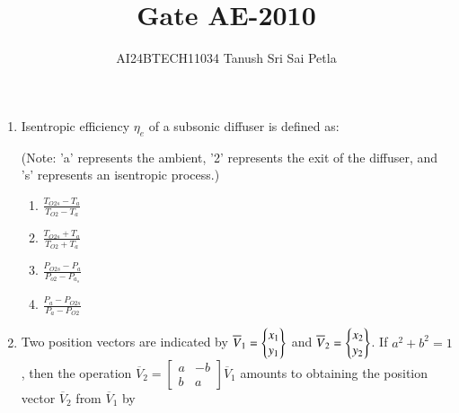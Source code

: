 \documentclass[journal]{IEEEtran}
\begin{document}

\vspace{3cm}


\renewcommand{\thefigure}{\theenumi}
\renewcommand{\thetable}{\theenumi}
\setlength{\intextsep}{10pt} %


\renewcommand{\thetable}{\theenumi}

\title{Gate AE-2010}
\author{AI24BTECH11034 Tanush Sri Sai Petla
}
\maketitle
\renewcommand{\thefigure}{\theenumi}
\renewcommand{\thetable}{\theenumi}
\begin{enumerate}[start=1]

\item  Isentropic efficiency $\eta_e$ of a subsonic diffuser is defined as:

(Note: 'a' represents the ambient, '2' represents the exit of the diffuser, and 's' represents an isentropic process.)

\begin{multicols}{4}
\begin{enumerate}
    \item $\frac{T_{O2s}-T_{a}}{T_{O2}-T_{a}}$
    \item $\frac{T_{O2s}+T_{a}}{T_{O2}+T_{a}}$
    \item $\frac{P_{O2s}-P_{a}}{P_{o2}-P_{a_s}}$
    \item $\frac{P_{a}-P_{O2s}}{P_{a}-P_{O2}}$
\end{enumerate}
\end{multicols}

\item Two position vectors are indicated by $\overline{V}_1 = \left\{\begin{matrix} x_1 \\ y_1 \end{matrix}\right\}$ and $\overline{V}_2 = \left\{\begin{matrix} x_2 \\ y_2 \end{matrix}\right\}$. If $a^2 + b^2 = 1$, then the operation $\overline{V}_2 = \begin{bmatrix} a & -b \\ b & a \end{bmatrix} \overline{V}_1$
   amounts to obtaining the position vector $\overline{V}_2$ from $\overline{V}_1$ by


\end{enumerate}
\end{document}
